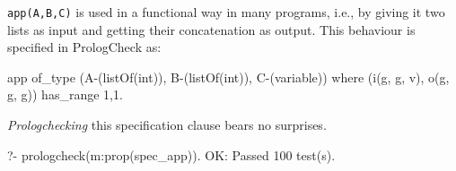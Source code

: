 \documentclass[runningheads,a4paper]{../../PaperStyles/llncs}
\newcommand{\yap}[1]{\lstinline[style=yap]{#1}}
\newcommand{\plqc}[0]{{\sf PrologCheck}}
\begin{document}
\yap{app(A,B,C)} is used in a functional way in many programs,
i.e., by giving it two lists as input and getting their concatenation as
output.
%
This behaviour is specified in \plqc{} as:
\begin{yapcode}
 app of_type (A-(listOf(int)), B-(listOf(int)), C-(variable))
   where (i(g, g, v), o(g, g, g))  has_range {1,1}.
\end{yapcode}
%
\emph{Prologchecking} this specification clause bears no surprises.
%
\begin{yapcode}
   ?- prologcheck(m:prop(spec_app)).
 OK: Passed 100 test(s).
\end{yapcode}
\end{document}

